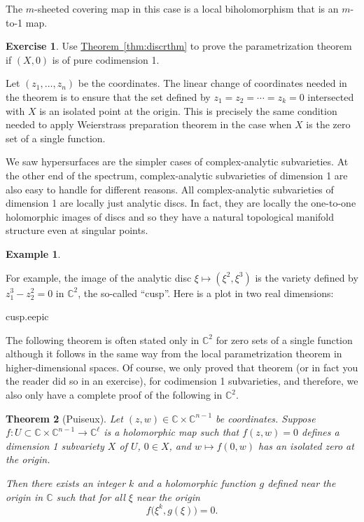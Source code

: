 \documentclass[12pt,openany]{book}
\newcommand{\C}{{\mathbb{C}}}
\newcommand{\myindex}[1]{#1\index{#1}}
\theoremstyle{plain}
\newtheorem{thm}{Theorem}[section]
\theoremstyle{remark}
\theoremstyle{definition}
\newenvironment{exbox}{%
    \def\FrameCommand{\vrule width 1pt \relax\hspace {10pt}}%
    \MakeFramed {\advance \hsize -\width \FrameRestore }%
}{%
    \endMakeFramed
}
\theoremstyle{exercise}
\newtheorem{exercise}{Exercise}[section]
\theoremstyle{example}
\newtheorem{example}[thm]{Example}
\newcommand{\thmref}[1]{\hyperref[#1]{Theorem~\ref*{#1}}}
\begin{document}
The $m$-sheeted covering map in this case is a local biholomorphism
that is an $m$-to-1 map.

\begin{exbox}
\begin{exercise}
Use \thmref{thm:discrthm}
to prove the parametrization theorem if $(X,0)$ is
of pure codimension 1.
\end{exercise}
\end{exbox}

Let $(z_1,\ldots,z_n)$ be the coordinates.
The linear change of coordinates needed in the theorem is
to ensure that the set defined by $z_1=z_2=\cdots=z_k = 0$ intersected
with $X$ is an isolated point at the origin.  This is precisely
the same condition needed to apply Weierstrass preparation theorem in the case
when $X$ is the zero set of a single function.

We saw hypersurfaces are the simpler cases of complex-analytic
subvarieties.  At the other end of the spectrum, complex-analytic
subvarieties of dimension 1 are also easy to handle for different reasons.
All complex-analytic subvarieties of dimension 1 are locally just analytic discs.
In fact, they are locally the one-to-one holomorphic images of discs
and so they have a natural topological manifold structure even at singular
points.

\begin{example}
\begin{samepage}
For example, the image of the analytic disc
$\xi \mapsto (\xi^2,\xi^3)$ is the variety
defined by $z_1^3-z_2^2 = 0$ in $\C^2$, the so-called ``cusp''.  Here is a
plot in two real dimensions:

\nopagebreak
\begin{center}
\medskip
{cusp.eepic}
\bigskip
\end{center}
\end{samepage}
\end{example}


The following theorem is often stated only in $\C^2$ for zero sets of
a single function although it follows in
the same way from the local parametrization theorem in higher-dimensional
spaces.  Of course, we only
proved that theorem (or in fact you the reader did so in an exercise), for
codimension 1 subvarieties, and therefore, we also only have a complete
proof of the following in $\C^2$.

\begin{thm}[\myindex{Puiseux}]
Let $(z,w) \in \C \times \C^{n-1}$ be coordinates.
Suppose $f \colon U \subset \C \times \C^{n-1} \to \C^\ell$
is a holomorphic map such that
$f(z,w) = 0$ defines a dimension 1 subvariety $X$ of $U$,
$0 \in X$,
and $w \mapsto f(0,w)$ has an isolated zero at the origin.

Then there exists an integer $k$ and a holomorphic function $g$ defined near
the origin in $\C$ such that
for all $\xi$ near the origin
\begin{equation*}
f\bigl(\xi^k,g(\xi)\bigr) = 0 .
\end{equation*}
\end{thm}
\end{document}

